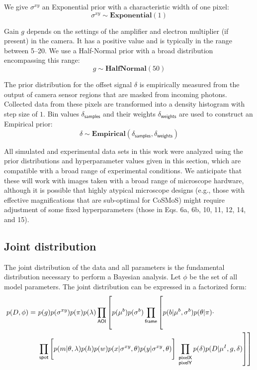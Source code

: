 We give $\sigma^{xy}$ an Exponential prior with a characteristic width of one pixel:
%
\begin{equation}
    \sigma^{xy} \sim \mathbf{Exponential}(1)
\end{equation}

Gain $g$ depends on the settings of the amplifier and electron multiplier (if present) in the camera. It has a positive value and is typically in the range between 5--20. We use a Half-Normal prior with a broad distribution encompassing this range:
%
\begin{equation}
    g \sim \mathbf{HalfNormal}(50)
\end{equation}

The prior distribution for the offset signal $\delta$ is empirically measured from the output of camera sensor regions that are masked from incoming photons. Collected data from these pixels are transformed into a density histogram with step size of $1$. Bin values $\delta_\mathsf{samples}$ and their weights $\delta_\mathsf{weights}$ are used to construct an Empirical prior:
%
\begin{equation}
    \delta \sim \mathbf{Empirical}(\delta_\mathsf{samples}, \delta_\mathsf{weights})
\end{equation}

All simulated and experimental data sets in this work were analyzed using the prior distributions and hyperparameter values given in this section, which are compatible with a broad range of experimental conditions.  We anticipate that these will work with images taken with a broad range of microscope hardware, although it is possible that highly atypical microscope designs (e.g., those with effective magnifications that are sub-optimal for CoSMoS) might require adjustment of some fixed hyperparameters (those in Eqs. 6a, 6b, 10, 11, 12, 14, and 15).

\subsection*{Joint distribution}

The joint distribution of the data and all parameters is the fundamental distribution necessary to perform a Bayesian analysis.  Let $\phi$ be the set of all model parameters. The joint distribution can be expressed in a factorized form:
%
\begin{equation}
\begin{aligned}
    p(D, \phi) =~&p(g) p(\sigma^{xy}) p(\pi) p(\lambda) \prod_{\mathsf{AOI}} \left[ p(\mu^b) p(\sigma^b) \prod_{\mathsf{frame}} \left[ \vphantom{\prod_{F}} p(b | \mu^b, \sigma^b) p(\theta | \pi) \vphantom{\prod_{\substack{\mathsf{pixelX} \\ \mathsf{pixelY}}}} \cdot \right. \right. \\
    &\prod_{\mathsf{spot}} \left[ \vphantom{\prod_{F}} p(m | \theta, \lambda) p(h) p(w) p(x | \sigma^{xy}, \theta) p(y | \sigma^{xy}, \theta) \right] \left. \left. \prod_{\substack{\mathsf{pixelX} \\ \mathsf{pixelY}}} p(\delta) p(D | \mu^I, g, \delta) \right] \right]
\end{aligned}
\end{equation}

